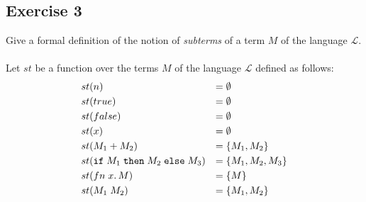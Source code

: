 \subsection{Exercise 3}

Give a formal definition of the notion of \emph{subterms} of a term $M$ of the language $\mathcal{L}$.\\\\
Let $st$ be a function over the terms $M$ of the language $\mathcal{L}$ defined as follows:
\begin{align*}
	 & st(n)                  & =\; & \emptyset           \\
	 & st(true)               & =\; & \emptyset           \\
	 & st(false)              & =\; & \emptyset           \\
	 & st(x)                  & =\; & \emptyset           \\
	 & st(M_1+M_2)     & =\; & \{ M_1, M_2 \}      \\
	 & st(\texttt{if}\;M_1\;\texttt{then}\;M_2\;\texttt{else}\;M_3) & =\; & \{ M_1, M_2, M_3 \} \\
	 & st(fn\;x.\,M)          & =\; & \{ M \}             \\
	 & st(M_1\;M_2)     & =\; & \{ M_1, M_2 \}      \\
\end{align*}
